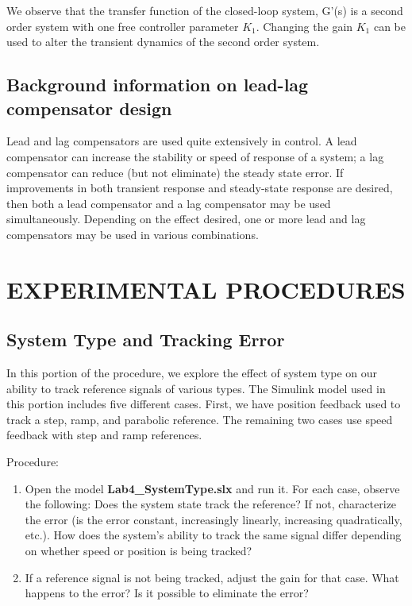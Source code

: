 \documentclass[11pt,a4paper]{article}
\begin{document}
We observe that the transfer function of the closed-loop system, G'(s) is a second order system with one free controller parameter $K_{1}$. Changing the gain $K_{1}$ can be used to alter the transient dynamics of the second order system.

\subsection{Background information on lead-lag compensator design}
Lead and lag compensators are used quite extensively in control. A lead compensator can increase the stability or speed of response of a system; a lag compensator can reduce (but not eliminate) the steady state error. If improvements in both transient response and steady-state response are desired, then both a lead compensator and a lag compensator may be used simultaneously. Depending on the effect desired, one or more lead and lag compensators may be used in various combinations.



\section{EXPERIMENTAL PROCEDURES}

\subsection{System Type and Tracking Error}
In this portion of the procedure, we explore the effect of system type on our ability to track reference signals of various types. The Simulink model used in this portion includes five different cases. First, we have position feedback used to track a step, ramp, and parabolic reference. The remaining two cases use speed feedback with step and ramp references. 

Procedure:
\begin{enumerate}
\item Open the model \textbf{Lab4\_SystemType.slx} and run it. For each case, observe the following: Does the system state track the reference? If not, characterize the error (is the error constant, increasingly linearly, increasing quadratically, etc.). How does the system's ability to track the same signal differ depending on whether speed or position is being tracked?

\item If a reference signal is not being tracked, adjust the gain for that case. What happens to the error? Is it possible to eliminate the error?
\end{enumerate}
\end{document}
